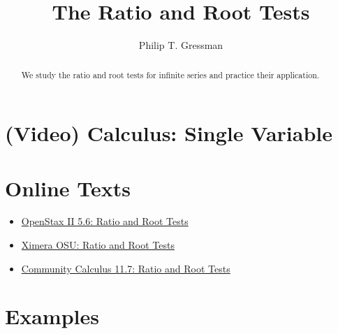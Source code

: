 \documentclass{ximera}
\title{The Ratio and Root Tests}
\author{Philip T. Gressman}
\begin{document}
\begin{abstract}
We study the ratio and root tests for infinite series and practice their application.
\end{abstract}
\maketitle

\section*{(Video) Calculus: Single Variable}

\section*{Online Texts}
\begin{itemize}
\item \href{https://openstax.org/books/calculus-volume-2/pages/5-6-ratio-and-root-tests}{OpenStax II 5.6: Ratio and Root Tests}
\item \href{https://ximera.osu.edu/mooculus/calculus2/ratioAndRootTest/titlePage}{Ximera OSU: Ratio and Root Tests}
\item \href{https://www.whitman.edu/mathematics/calculus_online/section11.07.html}{Community Calculus 11.7: Ratio and Root Tests}
\end{itemize}

\section*{Examples}

\begin{example}

\end{example}

\begin{example}

\end{example}
\end{document}
